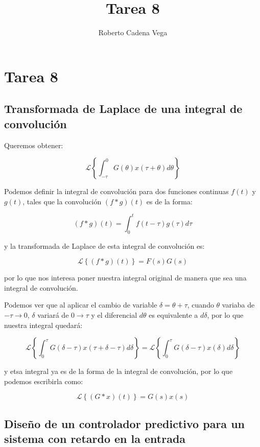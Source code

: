 \documentclass{article}
\title{Tarea 8}
\author{Roberto Cadena Vega}
\begin{document}
    
    
    \maketitle
    
    

    

    \section*{Tarea 8}



    \subsection*{Transformada de Laplace de una integral de convolución}


    Queremos obtener:

\[
\mathcal{L} \left\{ \int_{-\tau}^0 G(\theta) x(\tau + \theta) d\theta \right\}
\]

Podemos definir la integral de convolución para dos funciones continuas
\(f(t)\) y \(g(t)\), tales que la convolución \((f*g)(t)\) es de la
forma:

\[
(f*g)(t) = \int_0^t f(t - \tau) g(\tau) d\tau
\]

y la transformada de Laplace de esta integral de convolución es:

\[
\mathcal{L} \left\{ (f*g)(t) \right\} = F(s)G(s)
\]

por lo que nos interesa poner nuestra integral original de manera que
sea una integral de convolución.

Podemos ver que al aplicar el cambio de variable
\(\delta = \theta + \tau\), cuando \(\theta\) variaba de
\(-\tau \to 0\), \(\delta\) variará de \(0 \to \tau\) y el diferencial
\(d\theta\) es equivalente a \(d\delta\), por lo que nuestra integral
quedará:

\[
\mathcal{L} \left\{ \int_{0}^{\tau} G(\delta - \tau) x(\tau + \delta - \tau) d\delta \right\} = \mathcal{L} \left\{ \int_{0}^{\tau} G(\delta - \tau) x(\delta) d\delta \right\}
\]

y etsa integral ya es de la forma de la integral de convolución, por lo
que podemos escribirla como:

\[
\mathcal{L} \left\{ (G*x)(t) \right\} = G(s) x(s)
\]


    \subsection*{Diseño de un controlador predictivo para un sistema con retardo en la
entrada}
\end{document}
